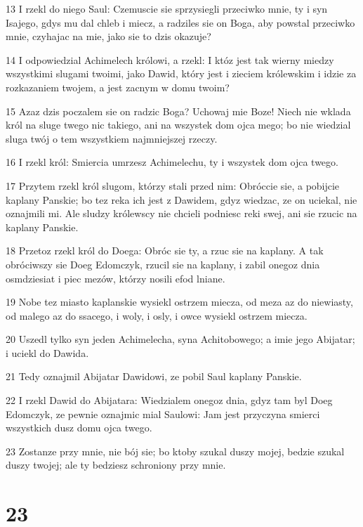 \par 13 I rzekl do niego Saul: Czemuscie sie sprzysiegli przeciwko mnie, ty i syn Isajego, gdys mu dal chleb i miecz, a radziles sie on Boga, aby powstal przeciwko mnie, czyhajac na mie, jako sie to dzis okazuje?
\par 14 I odpowiedzial Achimelech królowi, a rzekl: I któz jest tak wierny miedzy wszystkimi slugami twoimi, jako Dawid, który jest i zieciem królewskim i idzie za rozkazaniem twojem, a jest zacnym w domu twoim?
\par 15 Azaz dzis poczalem sie on radzic Boga? Uchowaj mie Boze! Niech nie wklada król na sluge twego nic takiego, ani na wszystek dom ojca mego; bo nie wiedzial sluga twój o tem wszystkiem najmniejszej rzeczy.
\par 16 I rzekl król: Smiercia umrzesz Achimelechu, ty i wszystek dom ojca twego.
\par 17 Przytem rzekl król slugom, którzy stali przed nim: Obróccie sie, a pobijcie kaplany Panskie; bo tez reka ich jest z Dawidem, gdyz wiedzac, ze on uciekal, nie oznajmili mi. Ale sludzy królewscy nie chcieli podniesc reki swej, ani sie rzucic na kaplany Panskie.
\par 18 Przetoz rzekl król do Doega: Obróc sie ty, a rzuc sie na kaplany. A tak obróciwszy sie Doeg Edomczyk, rzucil sie na kaplany, i zabil onegoz dnia osmdziesiat i piec mezów, którzy nosili efod lniane.
\par 19 Nobe tez miasto kaplanskie wysiekl ostrzem miecza, od meza az do niewiasty, od malego az do ssacego, i woly, i osly, i owce wysiekl ostrzem miecza.
\par 20 Uszedl tylko syn jeden Achimelecha, syna Achitobowego; a imie jego Abijatar; i uciekl do Dawida.
\par 21 Tedy oznajmil Abijatar Dawidowi, ze pobil Saul kaplany Panskie.
\par 22 I rzekl Dawid do Abijatara: Wiedzialem onegoz dnia, gdyz tam byl Doeg Edomczyk, ze pewnie oznajmic mial Saulowi: Jam jest przyczyna smierci wszystkich dusz domu ojca twego.
\par 23 Zostanze przy mnie, nie bój sie; bo ktoby szukal duszy mojej, bedzie szukal duszy twojej; ale ty bedziesz schroniony przy mnie.

\chapter{23}

